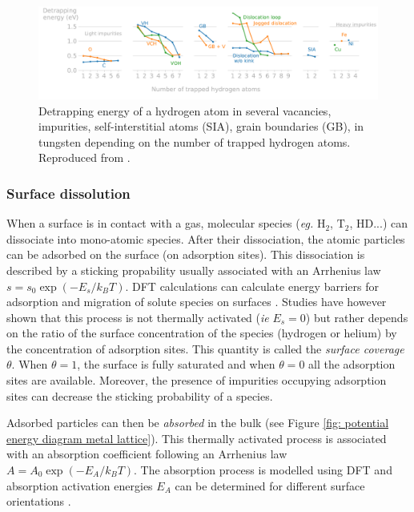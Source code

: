 \begin{figure}
    \centering
    \includegraphics[width=\linewidth]{Figures/Chapter1/trapping_energy_hydrogen_in_tungsten.pdf}
    \caption{Detrapping energy of a hydrogen atom in several vacancies, impurities, self-interstitial atoms (SIA), grain boundaries (GB), in tungsten depending on the number of trapped hydrogen atoms. Reproduced from \cite{hodille_study_2016}.}
    \label{fig: trapping energy hydrogen in tungsten}
\end{figure}

\subsubsection{Surface dissolution}

When a surface is in contact with a gas, molecular species (\textit{eg.} $\text{H}_2$, $\text{T}_2$, $\text{HD}$...) can dissociate into mono-atomic species.
After their dissociation, the atomic particles can be adsorbed on the surface (on adsorption sites).
This dissociation is described by a sticking propability usually associated with an Arrhenius law $s = s_0 \exp{(-E_s/k_B T)}$.
DFT calculations can calculate energy barriers for adsorption and migration of solute species on surfaces .
Studies have however shown that this process is not thermally activated (\textit{ie} $E_s=0$)  but rather depends on the ratio of the surface concentration of the species (hydrogen or helium) by the concentration of adsorption sites.
This quantity is called the \textit{surface coverage} $\theta$. 
When $\theta = 1$, the surface is fully saturated and when $\theta = 0$ all the adsorption sites are available.
Moreover, the presence of impurities occupying adsorption sites can decrease the sticking probability of a species.

Adsorbed particles can then be \textit{absorbed} in the bulk (see Figure \ref{fig: potential energy diagram metal lattice}).
This thermally activated process is associated with an absorption coefficient following an Arrhenius law $A=A_0 \exp{(-E_A/k_B T)}$.
The absorption process is modelled using DFT and absorption activation energies $E_A$ can be determined for different surface orientations .

